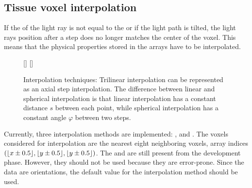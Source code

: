 \subsection{Tissue voxel interpolation}
%
If the \Stepsize{} of the light ray is not equal to the \Voxelsize{} or if the light path is tilted, the light rays position after a step does no longer matches the center of the voxel.
This means that the physical properties stored in the arrays have to be interpolated.
%
\begin{figure}[!t]
\centering
\setlength{\tikzwidth}{0.475\textwidth}
[\tikzwidth]{
\hfill{}\hfill}\hfill
{}
[\tikzwidth]{
}
\caption{Interpolation techniques: Trilinear interpolation can be represented as an axial step interpolation. The difference between linear and spherical interpolation is that linear interpolation has a constant distance $s$ between each point, while spherical interpolation has a constant angle $\varphi$ between two steps.}
\label{fig:vectorfield_disc}
\end{figure}
%
Currently, three interpolation methods are implemented: ,  and .
The voxels considered for interpolation are the nearest eight neighboring voxels, \ie{} array indices $(\lfloor x\pm0.5\rfloor,\lfloor y\pm0.5\rfloor,\lfloor y\pm0.5\rfloor)$.
The  and  are still present from the development phase.
However, they should not be used because they are error-prone.
Since the data are orientations, the default value for the interpolation method  should be used.
%
%
%
